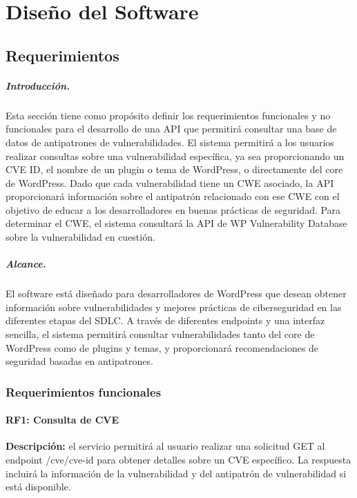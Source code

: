 \chapter{Diseño del Software}

\section{Requerimientos}

\paragraph{Introducción.}
Esta sección tiene como propósito definir los requerimientos funcionales y no funcionales para el desarrollo de una API que permitirá consultar una base de datos de antipatrones de vulnerabilidades. El sistema permitirá a los usuarios realizar consultas sobre una vulnerabilidad específica, ya sea proporcionando un CVE ID, el nombre de un plugin o tema de WordPress, o directamente del core de WordPress. Dado que cada vulnerabilidad tiene un CWE asociado, la API proporcionará información sobre el antipatrón relacionado con ese CWE con el objetivo de educar a los desarrolladores en buenas prácticas de seguridad. Para determinar el CWE, el sistema consultará la API de WP Vulnerability Database sobre la vulnerabilidad en cuestión.

\paragraph{Alcance.}

El software está diseñado para desarrolladores de WordPress que desean obtener información sobre vulnerabilidades y mejores prácticas de ciberseguridad en las diferentes etapas del SDLC. A través de diferentes endpoints y una interfaz sencilla, el sistema permitirá consultar vulnerabilidades tanto del core de WordPress como de plugins y temas, y proporcionará recomendaciones de seguridad basadas en antipatrones.


\subsection{Requerimientos funcionales}

\subsubsection{RF1: Consulta de CVE}

\textbf{Descripción:} el servicio permitirá al usuario realizar una solicitud GET al endpoint /cve/{cve-id} para obtener detalles sobre un CVE específico. La respuesta incluirá la información de la vulnerabilidad y del antipatrón de vulnerabilidad si está disponible.

